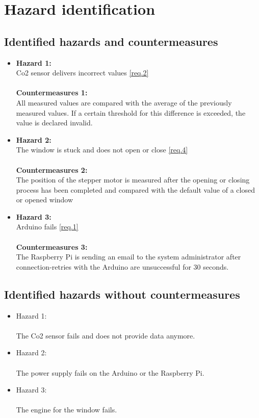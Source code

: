 \section{Hazard identification}
\label{chapter4}

\subsection{Identified hazards and countermeasures}


	\begin{itemize}
		\item \label{hazc.1} \textbf{Hazard 1:}
            \\	Co2 sensor delivers incorrect values \ref{req.2} \\\\
            \textbf{Countermeasures 1:}\\
            All measured values are compared with the average of the previously measured values. If a certain threshold for this difference is exceeded, the value is declared invalid.
		\item \label{hazc.2} \textbf{Hazard 2:}
            \\	The window is stuck and does not open or close \ref{req.4} \\\\
            \textbf{Countermeasures 2:}\\
            The position of the stepper motor is measured after the opening or closing process has been completed and compared with the default value of a closed or opened window
		\item \label{hazc.3} \textbf{Hazard 3:}
            \\	Arduino fails \ref{req.1} \\\\
            \textbf{Countermeasures 3:}\\
            The Raspberry Pi is sending an email to the system administrator after connection-retries with the Arduino are unsuccessful for 30 seconds.
	\end{itemize}
	
\subsection{Identified hazards without countermeasures }

	\begin{itemize}
		\item \label{haz.1} Hazard 1: \\
            \\	The Co2 sensor fails and does not provide data anymore.
		\item \label{haz.2} Hazard 2: \\
            \\	The power supply fails on the Arduino or the Raspberry Pi.
		\item \label{haz.3} Hazard 3: \\
            \\	The engine for the window fails. \\
	\end{itemize}